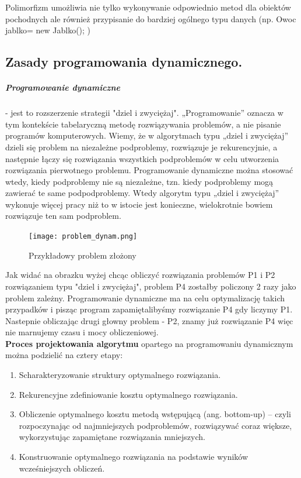 \documentclass[a4paper,12pt,oneside]{book}
\begin{document}
				Polimorfizm umożliwia nie tylko wykonywanie odpowiednio metod dla obiektów pochodnych
				ale również przypisanie do bardziej ogólnego typu danych (np. Owoc jablko= new Jablko(); )
			\newpage\subsection{Zasady programowania dynamicznego.}
				\subparagraph{Programowanie dynamiczne} - jest to rozszerzenie strategii "dziel i zwyciężaj". „Programowanie” oznacza w tym
				kontekście tabelaryczną metodę rozwiązywania problemów, a nie pisanie programów komputerowych. Wiemy, że w algorytmach typu „dziel i zwyciężaj” dzieli się problem na niezależne podproblemy, rozwiązuje je rekurencyjnie, a następnie łączy się rozwiązania
				wszystkich podproblemów w celu utworzenia rozwiązania pierwotnego problemu. Programowanie dynamiczne można stosować wtedy, kiedy podproblemy nie są niezależne, tzn. kiedy podproblemy mogą zawierać te same podpodproblemy. Wtedy algorytm typu „dziel i zwyciężaj” wykonuje więcej pracy niż to w istocie jest konieczne, wielokrotnie
				bowiem rozwiązuje ten sam podproblem. \\
				
				\begin{figure}[h!]
					\centering\texttt{[image: problem\_dynam.png]}
					\caption{Przykładowy problem złożony}
				\end{figure}
				
				Jak widać na obrazku wyżej chcąc obliczyć rozwiązania problemów P1 i P2 rozwiązaniem typu "dziel i zwyciężaj", problem P4 zostałby policzony 2 razy jako problem zależny. Programowanie dynamiczne ma na celu optymalizację takich przypadków i pisząc program zapamiętalibyśmy rozwiązanie P4 gdy liczymy P1. Nastepnie obliczając drugi głowny problem - P2, znamy już rozwiązanie P4 więc nie marnujemy czasu i mocy obliczeniowej.\\
				
				\textbf{Proces projektowania algorytmu} opartego na programowaniu dynamicznym można podzielić na cztery etapy: 
				\begin{enumerate}
					\item Scharakteryzowanie struktury optymalnego rozwiązania. 
					\item Rekurencyjne zdefiniowanie kosztu optymalnego rozwiązania.
					\item Obliczenie optymalnego kosztu metodą wstępującą (ang. bottom-up) – czyli rozpoczynając od najmniejszych podproblemów, rozwiązywać coraz większe, wykorzystując zapamiętane rozwiązania mniejszych.
					\item Konstruowanie optymalnego rozwiązania na podstawie wyników wcześniejszych obliczeń. 
				\end{enumerate}
				
\end{document}
